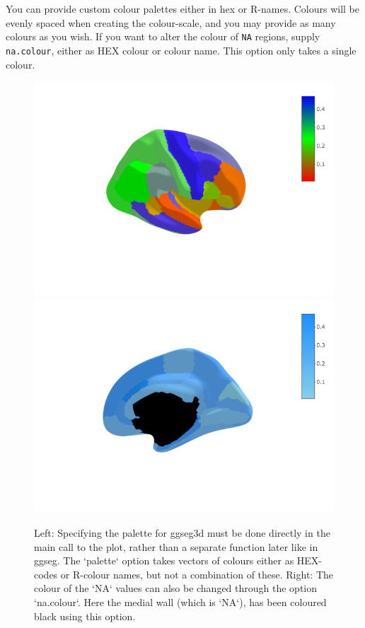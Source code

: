 \documentclass[fleqn,10pt]{wlpeerj} %
\newenvironment{Shaded}{\begin{snugshade}}{\end{snugshade}}
\newcommand{\CommentTok}[1]{\textcolor[rgb]{0.56,0.35,0.01}{\textit{#1}}}
\newcommand{\DataTypeTok}[1]{\textcolor[rgb]{0.13,0.29,0.53}{#1}}
\newcommand{\KeywordTok}[1]{\textcolor[rgb]{0.13,0.29,0.53}{\textbf{#1}}}
\newcommand{\NormalTok}[1]{#1}
\newcommand{\OperatorTok}[1]{\textcolor[rgb]{0.81,0.36,0.00}{\textbf{#1}}}
\newcommand{\StringTok}[1]{\textcolor[rgb]{0.31,0.60,0.02}{#1}}
\begin{document}
You can provide custom colour palettes either in hex or R-names.
Colours will be evenly spaced when creating the colour-scale, and you may provide as many colours as you wish.
If you want to alter the colour of \texttt{NA} regions, supply \texttt{na.colour}, either as HEX colour or colour name.
This option only takes a single colour.

\begin{Shaded}
\end{Shaded}

\begin{figure}
\includegraphics[width=0.4\linewidth]{png/ggseg3d_colour} \includegraphics[width=0.4\linewidth]{png/ggseg3d_nacolour} \caption{Left: Specifying the palette for ggseg3d must be done directly in the main call to the plot, rather than a separate function later like in ggseg. The `palette` option takes vectors of colours either as HEX-codes or R-colour names, but not a combination of these. Right: The colour of the `NA` values can also be changed through the option `na.colour`. Here the medial wall (which is `NA`), has been coloured black using this option.}\label{fig:ggseg3d-nacol}
\end{figure}
\end{document}
